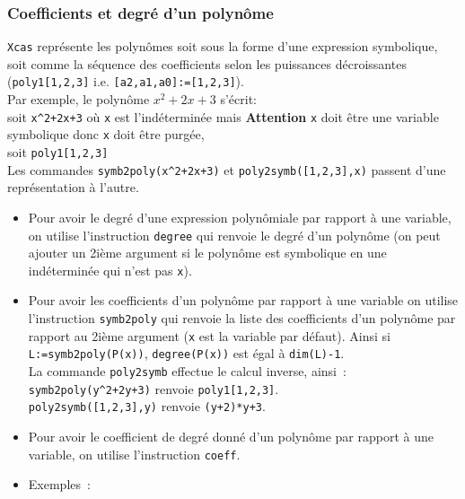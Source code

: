 \documentclass[12pt,a4paper]{book}
\begin{document}
\begin{giacjshere}
\subsubsection{Coefficients et degr\'e d'un  polyn\^ome}
{\tt Xcas} repr\'esente les polyn\^omes soit sous la forme d'une expression 
symbolique, soit comme la s\'equence des coefficients selon les puissances 
d\'ecroissantes ({\tt poly1[1,2,3]} i.e. {\tt [a2,a1,a0]:=[1,2,3]}).\\ 
Par exemple, le polyn\^ome $x^2+2x+3$ s'\'ecrit:\\
soit {\tt x\verb|^|2+2x+3} o\`u {\tt x} est l'ind\'etermin\'ee mais 
{\bf Attention} {\tt x} doit \^etre une variable symbolique donc {\tt x} doit 
\^etre purg\'ee,\\
 soit {\tt poly1[1,2,3]}\\
Les commandes {\tt symb2poly(x\verb|^|2+2x+3)} et {\tt poly2symb([1,2,3],x)} 
passent d'une repr\'esentation \`a l'autre.
\begin{itemize}
\item
Pour avoir le degr\'e d'une expression polyn\^omiale par rapport \`a une 
variable, on utilise
l'instruction {\tt degree} qui renvoie le degr\'e d'un polyn\^ome (on peut
ajouter un 2i\`eme argument si le polyn\^ome est symbolique en une 
ind\'etermin\'ee
qui n'est pas {\tt x}).
\item
Pour  avoir les coefficients d'un  polyn\^ome par rapport \`a une variable
on utilise l'instruction {\tt symb2poly} qui renvoie la liste des coefficients 
d'un polyn\^ome par rapport au 2i\`eme argument ({\tt x} est la variable par 
d\'efaut). Ainsi si {\tt L:=symb2poly(P(x))}, {\tt degree(P(x))} est \'egal \`a 
{\tt dim(L)-1}.\\
La commande {\tt poly2symb} effectue le calcul inverse, ainsi~:\\
{\tt symb2poly(y\verb|^|2+2y+3)} renvoie {\tt poly1[1,2,3]}.\\
{\tt poly2symb([1,2,3],y)} renvoie {\tt (y+2)*y+3}.
\item
Pour avoir le coefficient de degr\'e donn\'e d'un polyn\^ome par rapport \`a 
une variable,  on utilise l'instruction {\tt coeff}.
\item Exemples~:
\\
\\
\\
\\
\\
\\
\\
\end{itemize}


\end{giacjshere}
\end{document}
